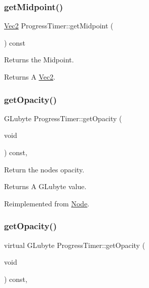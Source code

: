 \subsubsection{\texorpdfstring{get\+Midpoint()}{getMidpoint()}\hspace{0.1cm}{\footnotesize\ttfamily [2/2]}}
{\footnotesize\ttfamily \hyperlink{classVec2}{Vec2} Progress\+Timer\+::get\+Midpoint (\begin{DoxyParamCaption}{ }\end{DoxyParamCaption}) const}

Returns the Midpoint.

\begin{DoxyReturn}{Returns}
A \hyperlink{classVec2}{Vec2}. 
\end{DoxyReturn}
\mbox{\label{classProgressTimer_ae9f8f93b5849d34fce2fa84ffec463c1}} 
\subsubsection{\texorpdfstring{get\+Opacity()}{getOpacity()}\hspace{0.1cm}{\footnotesize\ttfamily [1/2]}}
{\footnotesize\ttfamily G\+Lubyte Progress\+Timer\+::get\+Opacity (\begin{DoxyParamCaption}\item[{void}]{ }\end{DoxyParamCaption}) const\hspace{0.3cm}{\ttfamily [override]}, {\ttfamily [virtual]}}

Return the node\textquotesingle{}s opacity. \begin{DoxyReturn}{Returns}
A G\+Lubyte value. 
\end{DoxyReturn}


Reimplemented from \hyperlink{classNode_ab999cce3763ea09e74014245c770ea97}{Node}.

\mbox{\label{classProgressTimer_ab65270de82c7f02e733ce017830c2409}} 
\subsubsection{\texorpdfstring{get\+Opacity()}{getOpacity()}\hspace{0.1cm}{\footnotesize\ttfamily [2/2]}}
{\footnotesize\ttfamily virtual G\+Lubyte Progress\+Timer\+::get\+Opacity (\begin{DoxyParamCaption}\item[{void}]{ }\end{DoxyParamCaption}) const\hspace{0.3cm}{\ttfamily [override]}, {\ttfamily [virtual]}}

